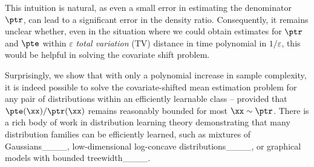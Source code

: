 This intuition is natural, as even a small error in estimating the denominator $\ptr$, can lead to a significant error in the density ratio. Consequently, it remains unclear whether, even in the situation where we could obtain estimates for $\ptr$ and $\pte$ within $\varepsilon$ \emph{total variation} (TV) distance in time polynomial in $1/\varepsilon$, this would be helpful in solving the covariate shift problem.


Surprisingly, we show that with only a polynomial increase in sample complexity, it is indeed possible to solve the covariate-shifted mean estimation problem for any pair of distributions within an efficiently learnable class -- provided that $\pte(\xx)/\ptr(\xx)$ remains reasonably bounded for most $\xx \sim \ptr$. There is a rich body of work in distribution learning theory demonstrating that many distribution families can be efficiently learned, such as mixtures of Gaussians____, low-dimensional log-concave distributions____, or graphical models with bounded treewidth____.